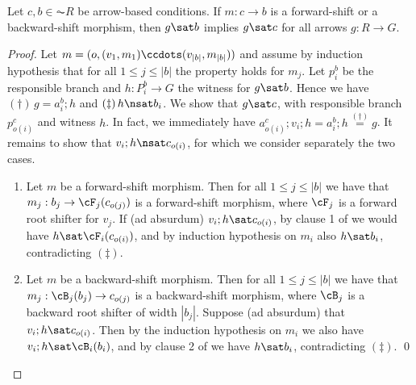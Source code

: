 \begin{proposition}
Let $c,b \in \AC{R}$  be arrow-based conditions. If $m:c\to b$ is a forward-shift or a backward-shift morphism, then $g\sat b$ implies $g \sat c$ for all arrows $g:R\to G$. 
\end{proposition}
%
\begin{fullorname}
\begin{proof}
Let $m = (o,(v_1,m_1)\ccdots (v_{|b|},m_{|b|}))$ and assume by induction hypothesis that for all $1\leq j\leq |b|$ the property holds for $m_j$. Let $p^b_i$ be the responsible branch and $h: P^b_i \to G$ the witness for $g\sat b$. 
Hence we have $(\dagger)\, g=a^b_i;h$ and $(\ddagger)\, h \nsat b_i$.  
We show that $g \sat c$, with responsible branch $p^c_{o(i)}$ and witness $h$. In fact, we immediately have  $a^c_{o(i)}; v_i ;h = a^b_i ; h \stackrel{(\dagger)}{=} g$. It remains to show that $v_i ;h \nsat c_{o(i)}$, for which we consider separately the two cases.
\begin{enumerate}
\item Let $m$ be a forward-shift morphism. Then for all $1\leq j\leq |b|$ we have that   $m_j:b_j \to \cF_j(c_{o(j)})$ is a forward-shift morphism, where $\cF_j$ is a forward root shifter for $v_j$. If (ad absurdum) $v_i ;h \sat c_{o(i)}$, by clause 1 of  we would have $h \sat \cF_i(c_{o(i)})$, and by induction hypothesis on $m_i$ also $h \sat b_i$, contradicting $(\ddagger)$.

\item Let $m$ be a backward-shift morphism. Then for all $1\leq j\leq |b|$ we have that  $m_j:\cB_j(b_j) \to c_{o(j)}$ is a backward-shift morphism, where $\cB_j$ is a backward root shifter of width $|b_j|$.
Suppose (ad absurdum) that $v_i ;h \sat c_{o(i)}$. Then by the induction hypothesis on $m_i$ we also have $v_i ;h \sat \cB_i(b_i)$, and by clause 2 of  we  have $h \sat b_i$, contradicting $(\ddagger)$.
\qed
\end{enumerate}
\end{proof}
\end{fullorname}

